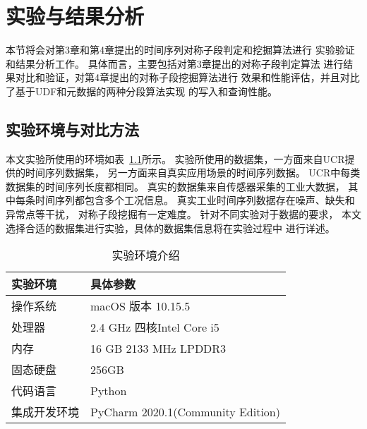 
\chapter{实验与结果分析}
本节将会对第3章和第4章提出的时间序列对称子段判定和挖掘算法进行
实验验证和结果分析工作。
具体而言，主要包括对第3章提出的对称子段判定算法
进行结果对比和验证，对第4章提出的对称子段挖掘算法进行
效果和性能评估，并且对比了基于UDF和元数据的两种分段算法实现
的写入和查询性能。

\section{实验环境与对比方法}
本文实验所使用的环境如表~\ref{tab:experiment_enviroment}所示。
实验所使用的数据集，一方面来自UCR提供的时间序列数据集，
另一方面来自真实应用场景的时间序列数据。
UCR中每类数据集的时间序列长度都相同。
真实的数据集来自传感器采集的工业大数据，
其中每条时间序列都包含多个工况信息。
真实工业时间序列数据存在噪声、缺失和异常点等干扰，
对称子段挖掘有一定难度。
针对不同实验对于数据的要求，
本文选择合适的数据集进行实验，具体的数据集信息将在实验过程中
进行详述。

\begin{table}
  \centering
  \caption{实验环境介绍}
  \begin{tabular}{ll}
    \toprule
    实验环境     & 具体参数                          \\
    \midrule
    操作系统     & macOS 版本 10.15.5                \\
    处理器       & 2.4 GHz 四核Intel Core i5         \\
    内存         & 16 GB 2133 MHz LPDDR3             \\
    固态硬盘     & 256GB                             \\
    代码语言     & Python                            \\
    集成开发环境 & PyCharm 2020.1(Community Edition) \\
    \bottomrule
  \end{tabular}
  \label{tab:experiment_enviroment}
\end{table}

